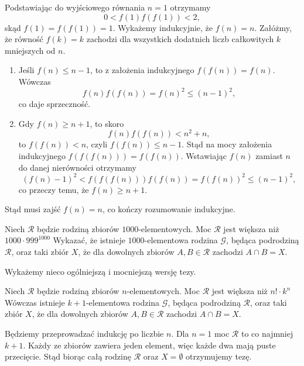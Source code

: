 \noindent
Podstawiając do wyjściowego równania $n = 1$ otrzymamy
\[
	0 < f(1)f(f(1)) < 2,
\]
skąd $f(1) = f(f(1)) = 1$.
Wykażemy indukcyjnie, że $f(n) = n$. Załóżmy, że równość $f(k) = k$ zachodzi dla wszystkich dodatnich liczb całkowitych $k$ mniejszych od $n$. 

\begin{enumerate}
	\item Jeśli $f(n) \leqslant n - 1$, to z założenia indukcyjnego $f(f(n)) = f(n)$. Wówczas
	\[
		f(n)f(f(n)) = f(n)^2 \leqslant (n - 1)^2,
	\]
	co daje sprzeczność.
	\item Gdy $f(n) \geqslant n + 1$, to skoro
	\[
		f(n)f(f(n)) < n^2 + n,
	\]
	to $f(f(n)) < n$, czyli $f(f(n)) \leqslant n - 1$. Stąd na mocy założenia indukcyjnego $f(f(f(n))) = f(f(n))$. Wstawiając $f(n)$ zamiast $n$ do danej nierówności otrzymamy
	\[
		(f(n) - 1)^2 < f(f(f(n)))f(f(n)) = f(f(n))^2 \leqslant (n - 1)^2,
	\]
	co przeczy temu, że $f(n) \geqslant n + 1$.
\end{enumerate}

\noindent
Stąd musi zajść $f(n) = n$, co kończy rozumowanie indukcyjne.

\begin{problem}{6}
	Niech $\mathcal{R}$ będzie rodziną zbiorów $1000$-elementowych. Moc $\mathcal{R}$ jest większa niż $1000 \cdot 999^{1000}$ Wykazać, że istnieje $1000$-elementowa rodzina $\mathcal{G}$, będąca podrodziną $\mathcal{R}$, oraz taki zbiór $X$, że dla dowolnych zbiorów $A, B \in \mathcal{R}$ zachodzi $A \cap B = X$.
\end{problem}

\noindent
Wykażemy nieco ogólniejszą i mocniejszą wersję tezy.

\vspace{10px}

\noindent
Niech $\mathcal{R}$ będzie rodziną zbiorów $n$-elementowych. Moc $\mathcal{R}$ jest większa niż $n! \cdot k^{n}$ Wówczas istnieje $k+1$-elementowa rodzina $\mathcal{G}$, będąca podrodziną $\mathcal{R}$, oraz taki zbiór $X$, że dla dowolnych zbiorów $A, B \in \mathcal{R}$ zachodzi $A \cap B = X$.

\vspace{10px}

\noindent
Będziemy przeprowadzać indukcję po liczbie $n$. Dla $n = 1$ moc $\mathcal{R}$ to co najmniej $k + 1$. Każdy ze zbiorów zawiera jeden element, więc każde dwa mają puste przecięcie. Stąd biorąc całą rodzinę $\mathcal{R}$ oraz $X = \emptyset$ otrzymujemy tezę.

